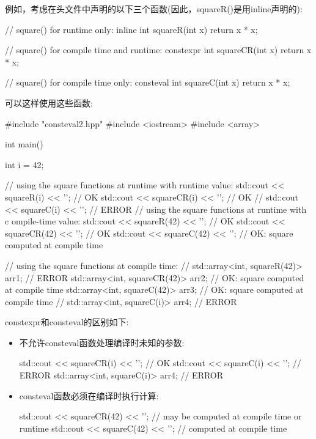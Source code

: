 例如，考虑在头文件中声明的以下三个函数(因此，squareR()是用inline声明的):


\begin{cpp}
// square() for runtime only:
inline int squareR(int x) {
	return x * x;
}

// square() for compile time and runtime:
constexpr int squareCR(int x) {
	return x * x;
}

// square() for compile time only:
consteval int squareC(int x) {
	return x * x;
}
\end{cpp}

可以这样使用这些函数:


\begin{cpp}
#include "consteval2.hpp"
#include <iostream>
#include <array>

int main()
{
	int i = 42;

	// using the square functions at runtime with runtime value:
	std::cout << squareR(i) << '\n'; // OK
	std::cout << squareCR(i) << '\n'; // OK
	// std::cout << squareC(i) << ’’; // ERROR
	// using the square functions at runtime with c
	ompile-time value:
	std::cout << squareR(42) << '\n'; // OK
	std::cout << squareCR(42) << '\n'; // OK
	std::cout << squareC(42) << '\n'; // OK: square computed at compile time

	// using the square functions at compile time:
	// std::array<int, squareR(42)> arr1; // ERROR
	std::array<int, squareCR(42)> arr2; // OK: square computed at compile time
	std::array<int, squareC(42)> arr3; // OK: square computed at compile time
	// std::array<int, squareC(i)> arr4; // ERROR
}
\end{cpp}

constexpr和consteval的区别如下:

\begin{itemize}
\item
不允许consteval函数处理编译时未知的参数:

\begin{cpp}
std::cout << squareCR(i) << '\n'; // OK
std::cout << squareC(i) << '\n'; // ERROR
std::array<int, squareC(i)> arr4; // ERROR
\end{cpp}

\item
consteval函数必须在编译时执行计算:

\begin{cpp}
std::cout << squareCR(42) << '\n'; // may be computed at compile time or runtime
std::cout << squareC(42) << '\n'; // computed at compile time
\end{cpp}

\end{itemize}

